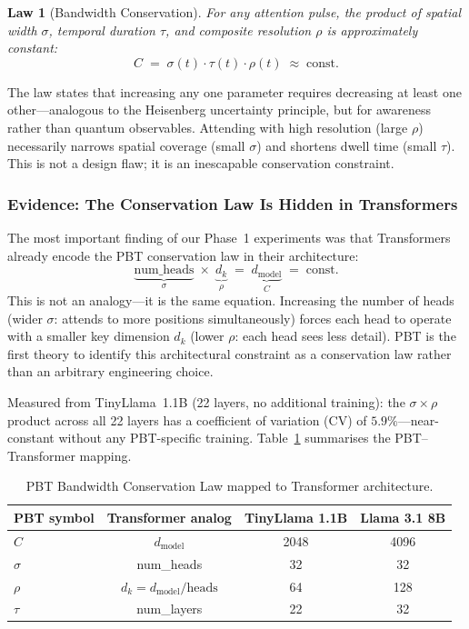 \documentclass[12pt,a4paper]{article}
\newtheorem{law}{Law}[section]
\begin{document}
\begin{law}[Bandwidth Conservation]
For any attention pulse, the product of spatial width $\sigma$, temporal
duration $\tau$, and composite resolution $\rho$ is approximately constant:
\begin{equation}
  C \;=\; \sigma(t)\cdot\tau(t)\cdot\rho(t) \;\approx\; \mathrm{const}.
  \label{eq:BCL}
\end{equation}
\end{law}

The law states that increasing any one parameter requires decreasing at least
one other---analogous to the Heisenberg uncertainty principle, but for
awareness rather than quantum observables. Attending with high resolution
(large $\rho$) necessarily narrows spatial coverage (small $\sigma$) and
shortens dwell time (small $\tau$). This is not a design flaw; it is an
inescapable conservation constraint.

\subsubsection{Evidence: The Conservation Law Is Hidden in Transformers}

The most important finding of our Phase~1 experiments was that Transformers
already encode the PBT conservation law in their architecture:
\begin{equation}
  \underbrace{\text{num\_heads}}_{\sigma}
  \;\times\;
  \underbrace{d_k}_{\rho}
  \;=\;
  \underbrace{d_{\mathrm{model}}}_{C}
  \;=\; \text{const}.
  \label{eq:transformer_BCL}
\end{equation}
This is not an analogy---it is the same equation. Increasing the number of
heads (wider $\sigma$: attends to more positions simultaneously) forces each
head to operate with a smaller key dimension $d_k$ (lower $\rho$: each head
sees less detail). PBT is the first theory to identify this architectural
constraint as a conservation law rather than an arbitrary engineering choice.

Measured from TinyLlama~1.1B (22 layers, no additional training): the
$\sigma\!\times\!\rho$ product across all 22 layers has a coefficient of
variation (CV) of $\mathbf{5.9\%}$---near-constant without any PBT-specific
training. Table~\ref{tab:BCL_mapping} summarises the PBT--Transformer mapping.

\begin{table}[ht]
\centering
\caption{PBT Bandwidth Conservation Law mapped to Transformer architecture.}
\label{tab:BCL_mapping}
\small
\begin{tabular}{@{}lccc@{}}
\toprule
\textbf{PBT symbol} & \textbf{Transformer analog}
  & \textbf{TinyLlama 1.1B} & \textbf{Llama 3.1 8B} \\
\midrule
$C$ & $d_{\mathrm{model}}$          & 2048 & 4096 \\
$\sigma$ & num\_heads               & 32   & 32   \\
$\rho$   & $d_k = d_{\mathrm{model}}/\mathrm{heads}$ & 64 & 128 \\
$\tau$   & num\_layers              & 22   & 32   \\
\bottomrule
\end{tabular}
\end{table}
\end{document}
